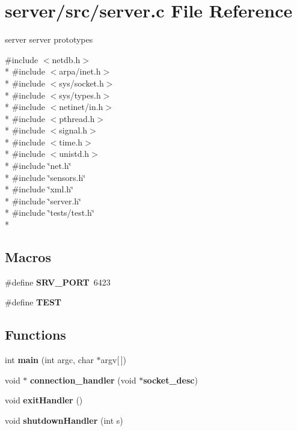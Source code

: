 \section{server/src/server.c File Reference}
\label{server_8c}


server server prototypes  


{\ttfamily \#include $<$netdb.\-h$>$}\\*
{\ttfamily \#include $<$arpa/inet.\-h$>$}\\*
{\ttfamily \#include $<$sys/socket.\-h$>$}\\*
{\ttfamily \#include $<$sys/types.\-h$>$}\\*
{\ttfamily \#include $<$netinet/in.\-h$>$}\\*
{\ttfamily \#include $<$pthread.\-h$>$}\\*
{\ttfamily \#include $<$signal.\-h$>$}\\*
{\ttfamily \#include $<$time.\-h$>$}\\*
{\ttfamily \#include $<$unistd.\-h$>$}\\*
{\ttfamily \#include \char`\"{}net.\-h\char`\"{}}\\*
{\ttfamily \#include \char`\"{}sensors.\-h\char`\"{}}\\*
{\ttfamily \#include \char`\"{}xml.\-h\char`\"{}}\\*
{\ttfamily \#include \char`\"{}server.\-h\char`\"{}}\\*
{\ttfamily \#include \char`\"{}tests/test.\-h\char`\"{}}\\*
\subsection*{Macros}
\begin{DoxyCompactItemize}
\item 
\#define {\bf S\-R\-V\-\_\-\-P\-O\-R\-T}~6423
\item 
\#define {\bf T\-E\-S\-T}
\end{DoxyCompactItemize}
\subsection*{Functions}
\begin{DoxyCompactItemize}
\item 
int {\bf main} (int argc, char $\ast$argv[$\,$])
\item 
void $\ast$ {\bf connection\-\_\-handler} (void $\ast${\bf socket\-\_\-desc})
\item 
void {\bf exit\-Handler} ()
\item 
void {\bf shutdown\-Handler} (int s)
\end{DoxyCompactItemize}
